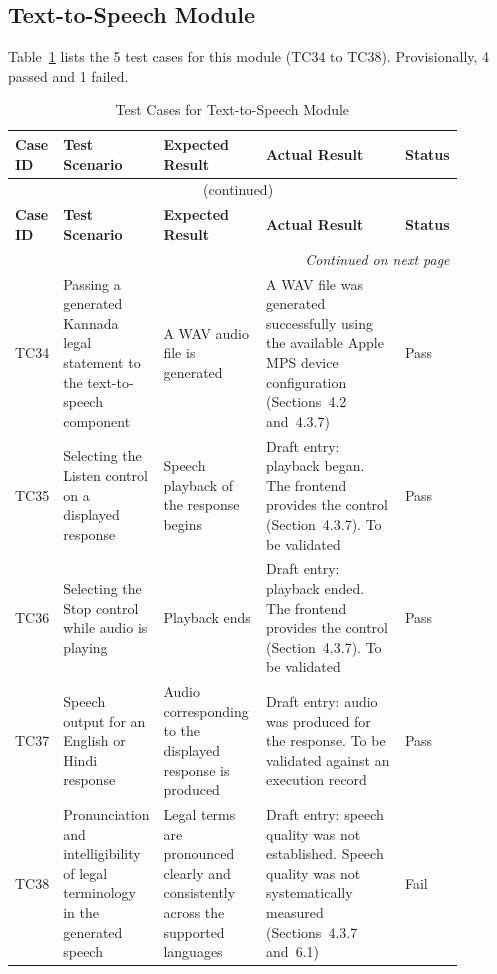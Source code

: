 \documentclass[12pt,a4paper,oneside]{report}
\begin{document}
\subsection{Text-to-Speech Module}
Table~\ref{tab:tts} lists the 5 test cases for this module (TC34 to TC38). Provisionally, 4 passed and 1 failed.
{\footnotesize
\setlength{\tabcolsep}{3pt}
\renewcommand{\arraystretch}{1.15}
\begin{longtable}{|p{0.075\linewidth}|p{0.19\linewidth}|p{0.23\linewidth}|p{0.32\linewidth}|p{0.08\linewidth}|}
\caption{Test Cases for Text-to-Speech Module}\label{tab:tts}\\
\hline
\textbf{Case ID} & \textbf{Test Scenario} & \textbf{Expected Result} & \textbf{Actual Result} & \textbf{Status}\\
\hline
\endfirsthead
\multicolumn{5}{c}{\tablename~\thetable{} (continued)}\\
\hline
\textbf{Case ID} & \textbf{Test Scenario} & \textbf{Expected Result} & \textbf{Actual Result} & \textbf{Status}\\
\hline
\endhead
\hline
\multicolumn{5}{r}{\emph{Continued on next page}}\\
\endfoot
\hline
\endlastfoot
TC34 & Passing a generated Kannada legal statement to the text-to-speech component & A WAV audio file is generated & A WAV file was generated successfully using the available Apple MPS device configuration (Sections~4.2 and~4.3.7) & Pass\\
\hline
TC35 & Selecting the Listen control on a displayed response & Speech playback of the response begins & Draft entry: playback began. The frontend provides the control (Section~4.3.7). To be validated & Pass\\
\hline
TC36 & Selecting the Stop control while audio is playing & Playback ends & Draft entry: playback ended. The frontend provides the control (Section~4.3.7). To be validated & Pass\\
\hline
TC37 & Speech output for an English or Hindi response & Audio corresponding to the displayed response is produced & Draft entry: audio was produced for the response. To be validated against an execution record & Pass\\
\hline
TC38 & Pronunciation and intelligibility of legal terminology in the generated speech & Legal terms are pronounced clearly and consistently across the supported languages & Draft entry: speech quality was not established. Speech quality was not systematically measured (Sections~4.3.7 and~6.1) & Fail\\
\end{longtable}
}
\end{document}

